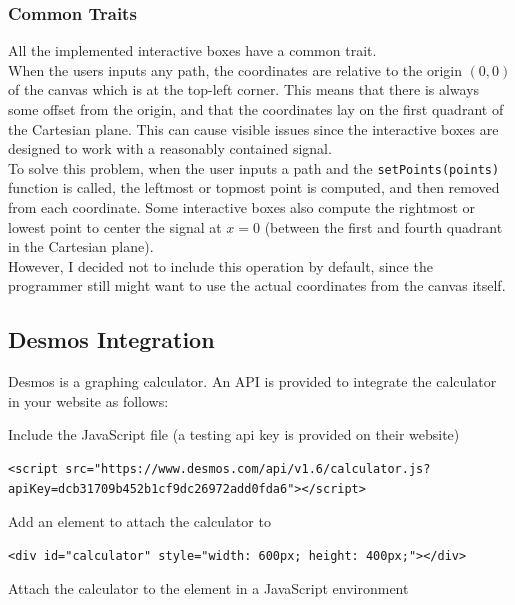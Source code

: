 \documentclass{article}
\begin{document}
\subsubsection{Common Traits}

All the implemented interactive boxes have a common trait. \\
When the users inputs any path, the coordinates are relative to the origin \((0,0)\)
of the canvas which is at the top-left corner. This means that there is always some
offset from the origin, and that the coordinates
lay on the first quadrant of the Cartesian plane.
This can cause visible issues since the interactive boxes are designed to work with a reasonably contained signal.
\\
To solve this problem, when the user inputs a path and the \texttt{setPoints(points)} function is called,
the leftmost or topmost point is computed, and then removed from each coordinate.
Some interactive boxes also compute the rightmost or lowest point to center the signal at \(x=0\)
(between the first and fourth quadrant in the Cartesian plane).
\\
However, I decided not to include this operation by default, since the programmer still
might want to use the actual coordinates from the canvas itself.

\pagebreak

\subsection{Desmos Integration}

Desmos is a graphing calculator. An API\cite{desmos} is provided to integrate the calculator in your website as follows:

Include the JavaScript file (a testing api key is provided on their website)

\begin{lstlisting}[style=html]
    <script src="https://www.desmos.com/api/v1.6/calculator.js?apiKey=dcb31709b452b1cf9dc26972add0fda6"></script>
\end{lstlisting}

Add an element to attach the calculator to

\begin{lstlisting}[style=html]
    <div id="calculator" style="width: 600px; height: 400px;"></div>
\end{lstlisting}

Attach the calculator to the element in a JavaScript environment
\end{document}
